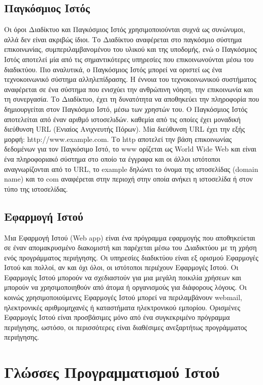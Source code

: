 \subsection{Παγκόσμιος Ιστός}
Οι όροι Διαδίκτυο και Παγκόσμιος Ιστός χρησιμοποιούνται συχνά ως συνώνυμοι, αλλά δεν είναι ακριβώς ίδιοι. Το Διαδίκτυο αναφέρεται στο παγκόσμιο σύστημα επικοινωνίας, συμπεριλαμβανομένου του υλικού και της υποδομής, ενώ ο Παγκόσμιος Ιστός αποτελεί μία από τις σημαντικότερες υπηρεσίες που επικοινωνούνται μέσω του διαδικτύου. Πιο αναλυτικά, ο Παγκόσμιος Ιστός μπορεί να οριστεί ως ένα τεχνοκοινωνικό σύστημα αλληλεπίδρασης. Η έννοια του τεχνοκοινωνικού συστήματος αναφέρεται σε ένα σύστημα που ενισχύει την ανθρώπινη νόηση, την επικοινωνία και τη συνεργασία. Το Διαδίκτυο, έχει τη δυνατότητα να αποθηκεύει την πληροφορία που δημιουργείται στον Παγκόσμιο Ιστό, μέσω των χρηστών του. Ο Παγκόσμιος Ιστός αποτελείται από έναν αριθμό ιστοσελιδών. καθεμία από τις οποίες έχει μοναδική διεύθυνση URL (Ενιαίος Ανιχνευτής Πόρων). Μία διεύθυνση URL έχει την εξής μορφή: http://www.example.com. Το http αποτελεί την βάση επικοινωνίας δεδομένων για τον Παγκόσιμο Ιστό, το www ορίζεται ως World Wide Web και είναι ένα πληροφοριακό σύστημα στο οποίο τα έγγραφα και οι άλλοι ιστότοποι αναγνωρίζονται από το URL, το example δηλώνει το όνομα της ιστοσελίδας (domain name) και το com αναφέρεται στην περιοχή στην οποία ανήκει η ιστοσελίδα ή στον τύπο της ιστοσελίδας.

\subsection{Εφαρμογή Ιστού}
Μια Εφαρμογή Ιστού (Web app) είναι ένα πρόγραμμα εφαρμογής που αποθηκεύεται σε έναν απομακρυσμένο διακομιστή και παρέχεται μέσω του Διαδικτύου με τη χρήση ενός προγράμματος περιήγησης. Οι υπηρεσίες διαδικτύου είναι εξ ορισμού Εφαρμογές Ιστού και πολλοί, αν και όχι όλοι, οι ιστότοποι περιέχουν Εφαρμογές Ιστού.
Οι Εφαρμογές Ιστού μπορούν να σχεδιαστούν για μια μεγάλη ποικιλία χρήσεων και μπορούν να χρησιμοποιηθούν από άτομα ή οργανισμούς για διάφορους λόγους. Οι κοινώς χρησιμοποιούμενες Εφαρμογές Ιστού μπορεί να περιλαμβάνουν webmail, ηλεκτρονικές αριθμομηχανές ή καταστήματα ηλεκτρονικού εμπορίου. Ορισμένες Εφαρμογές Ιστού είναι προσβάσιμες μόνο από ένα συγκεκριμένο πρόγραμμα περιήγησης, ωστόσο, οι περισσότερες είναι διαθέσιμες ανεξαρτήτως προγράμματος περιήγησης.

\section{Γλώσσες Προγραμματισμού Ιστού}

